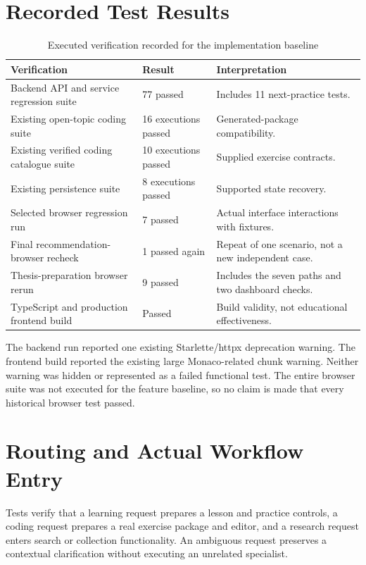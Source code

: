 \section{Recorded Test Results}
\begin{table}[htbp]\centering\small
\caption{Executed verification recorded for the implementation baseline}\label{tab:test-results}
\begin{tabular}{P{0.47\textwidth}P{0.18\textwidth}P{0.25\textwidth}}\toprule
Verification & Result & Interpretation\\\midrule
Backend API and service regression suite & 77 passed & Includes 11 next-practice tests.\\
Existing open-topic coding suite & 16 executions passed & Generated-package compatibility.\\
Existing verified coding catalogue suite & 10 executions passed & Supplied exercise contracts.\\
Existing persistence suite & 8 executions passed & Supported state recovery.\\
Selected browser regression run & 7 passed & Actual interface interactions with fixtures.\\
Final recommendation-browser recheck & 1 passed again & Repeat of one scenario, not a new independent case.\\
Thesis-preparation browser rerun & 9 passed & Includes the seven paths and two dashboard checks.\\
TypeScript and production frontend build & Passed & Build validity, not educational effectiveness.\\\bottomrule
\end{tabular}
\end{table}

The backend run reported one existing Starlette/httpx deprecation warning. The frontend build reported the existing large Monaco-related chunk warning. Neither warning was hidden or represented as a failed functional test. The entire browser suite was not executed for the feature baseline, so no claim is made that every historical browser test passed.

\section{Routing and Actual Workflow Entry}
Tests verify that a learning request prepares a lesson and practice controls, a coding request prepares a real exercise package and editor, and a research request enters search or collection functionality. An ambiguous request preserves a contextual clarification without executing an unrelated specialist.

